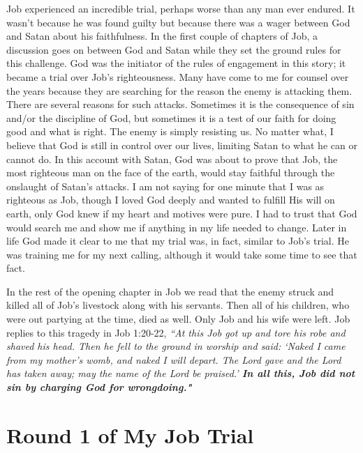 \documentclass[oneside,12pt]{book}
\begin{document}
Job experienced an incredible trial, perhaps worse than any man ever endured. It wasn't because he was found guilty but because there was a wager between God and Satan about his faithfulness. In the first couple of chapters of Job, a discussion goes on between God and Satan while they set the ground rules for this challenge. God was the initiator of the rules of engagement in this story; it became a trial over Job's righteousness. Many have come to me for counsel over the years because they are searching for the reason the enemy is attacking them. There are several reasons for such attacks. Sometimes it is the consequence of sin and/or the discipline of God, but sometimes it is a test of our faith for doing good and what is right. The enemy is simply resisting us. No matter what, I believe that God is still in control over our lives, limiting Satan to what he can or cannot do. In this account with Satan, God was about to prove that Job, the most righteous man on the face of the earth, would stay faithful through the onslaught of Satan's attacks. I am not saying for one minute that I was as righteous as Job, though I loved God deeply and wanted to fulfill His will on earth, only God knew if my heart and motives were pure. I had to trust that God would search me and show me if anything in my life needed to change. Later in life God made it clear to me that my trial was, in fact, similar to Job's trial. He was training me for my next calling, although it would take some time to see that fact.

In the rest of the opening chapter in Job we read that the enemy struck and killed all of Job's livestock along with his servants. Then all of his children, who were out partying at the time, died as well. Only Job and his wife were left. Job replies to this tragedy in Job 1:20-22, \textit{``At this Job got up and tore his robe and shaved his head. Then he fell to the ground in worship and said: `Naked I came from my mother's womb, and naked I will depart. The Lord gave and the Lord has taken away; may the name of the Lord be praised.' \textbf{In all this, Job did not sin by charging God for wrongdoing."}}


\section{Round 1 of My Job Trial}
\
\end{document}
